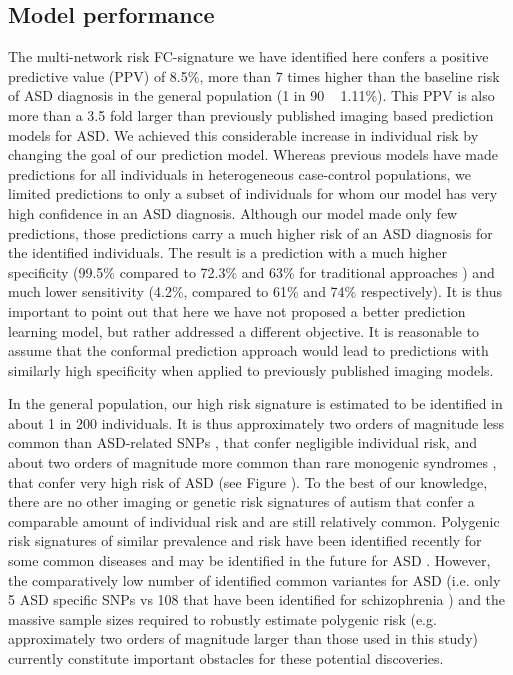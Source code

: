 \documentclass[9pt,lineno]{elife}
\begin{document}
\subsection{Model performance}
The multi-network risk FC-signature we have identified here confers a positive predictive value (PPV) of 8.5\%, more than 7 times higher than the baseline risk of ASD diagnosis in the general population (1 in 90 ~ 1.11\%). This PPV is also more than a 3.5 fold larger than previously published imaging based prediction models for ASD. We achieved this considerable increase in individual risk by changing the goal of our prediction model. Whereas previous models have made predictions for all individuals in heterogeneous case-control populations, we limited predictions to only a subset of individuals for whom our model has very high confidence in an ASD diagnosis. Although our model made only few predictions, those predictions carry a much higher risk of an ASD diagnosis for the identified individuals. The result is a prediction with a much higher specificity (99.5\% compared to 72.3\% and 63\% for traditional approaches \citep{Heinsfeld2018-yl,Abraham2017-vf}) and much lower sensitivity (4.2\%, compared to 61\% and 74\% respectively). It is thus important to point out that here we have not proposed a better prediction learning model, but rather addressed a different objective. It is reasonable to assume that the conformal prediction approach would lead to predictions with similarly high specificity when applied to previously published imaging models.

In the general population, our high risk signature is estimated to be identified in about 1 in 200 individuals. It is thus approximately two orders of magnitude less common than ASD-related SNPs \citep{Grove2019-vz}, that confer negligible individual risk, and about two orders of magnitude more common than rare monogenic syndromes \citep{De_la_Torre-Ubieta2016-fw}, that confer very high risk of ASD (see Figure ). To the best of our knowledge, there are no other imaging or genetic risk signatures of autism that confer a comparable amount of individual risk and are still relatively common. Polygenic risk signatures of similar prevalence and risk have been identified recently for some common diseases \citep{Khera2018-of} and may be identified in the future for ASD \citep{Martin2018-id}. However, the comparatively low number of identified common variantes for ASD (i.e. only 5 ASD specific SNPs \citep{Grove2019-vz} vs 108 that have been identified for schizophrenia \citep{Schizophrenia_Working_Group_of_the_Psychiatric_Genomics_Consortium2014-ld}) and the massive sample sizes required to robustly estimate polygenic risk (e.g. approximately two orders of magnitude larger than those used in this study) currently constitute important obstacles for these potential discoveries. 
\end{document}
